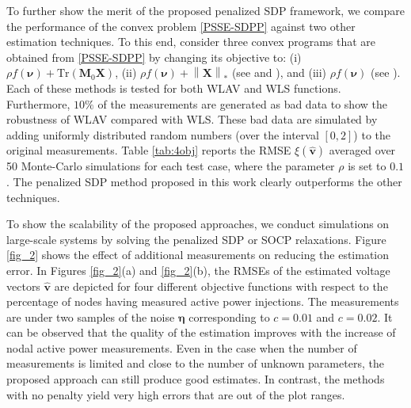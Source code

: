 \documentclass[journal,twoside]{IEEEtran}
\newcommand{\Tr}{\mathrm{Tr}}
\newcommand{\nuclearnorm}[1]{\left\lVert#1\right\rVert_*}
\newcommand{\bv}{\mathbf{v}}
\newcommand{\bM}{\mathbf{M}}
\newcommand{\bX}{\mathbf{X}}
\newcommand{\bnu}{\bm{\nu}}
\begin{document}
To further  show the merit of the  proposed penalized SDP framework,
we compare the performance of the convex problem \eqref{PSSE-SDPP} against two  other estimation techniques.
To this end, consider three convex programs that are obtained from  \eqref{PSSE-SDPP} by changing its objective to:
(i) $\rho f(\bnu)+\Tr(\bM_0\bX)$, (ii) $\rho f(\bnu)+\nuclearnorm{\bX}$ (see \cite{Weng15} and \cite{Kim15}),
 and  (iii)  $\rho f(\bnu)$ (see  \cite{Zhu11,Zhu14,Weng12,Weng13}).
Each of these methods is tested for  both WLAV and  WLS  functions. 
Furthermore,  $10\%$ of the measurements are generated as bad data to show the robustness of  WLAV compared with  WLS.
These bad data are simulated by adding uniformly distributed random numbers (over the interval $[0,2]$) to the original measurements.
Table \ref{tab:4obj} reports the RMSE $\xi(\hat{\bv})$ averaged over 50 Monte-Carlo simulations for each test case,
where the parameter $\rho$ is set to $0.1$.
The penalized SDP method proposed in this work clearly outperforms the other techniques.

To show the scalability of the proposed approaches, we conduct simulations on large-scale systems by solving the penalized SDP or SOCP relaxations.
Figure \ref{fig_2}  shows the effect of additional measurements on reducing the estimation error.
In Figures \ref{fig_2}(a) and \ref{fig_2}(b), the RMSEs of the
estimated voltage vectors $\hat{\bv}$ are depicted  for  four different objective functions 
with respect to the percentage of nodes having measured active power injections.
The measurements are under two samples of the noise $\boldsymbol{\eta}$ corresponding to $c=0.01$ and $c=0.02$. 
It can be observed that the quality of  the estimation improves with the increase of nodal active power  measurements.
Even in the case when the number of measurements is limited and close to the number of unknown parameters, the proposed approach can still produce good estimates. In contrast, the methods with no penalty yield very high errors that are out of the plot ranges.


\end{document}
